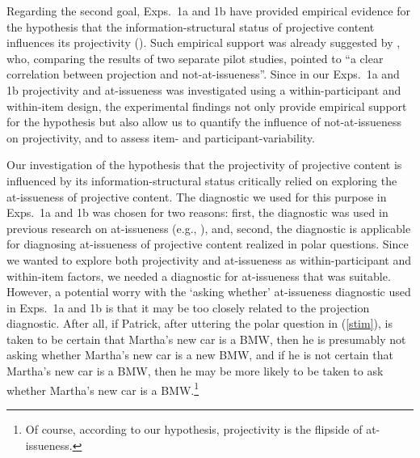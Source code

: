 \documentclass[11pt,fleqn]{article}
\newcommand{\6}{\mbox{$[\hspace*{-.6mm}[$}}
\newcommand{\9}{\mbox{$]\hspace*{-.6mm}]$}}
\begin{document}
Regarding the second goal, Exps.~1a and 1b have provided empirical evidence for the hypothesis that the information-structural status of projective content influences its projectivity (\citealt{brst-salt10,brst-ar}). Such empirical support was already suggested by \citet[180]{xue-onea11}, who, comparing the results of two separate pilot studies, pointed to ``a clear correlation between projection and not-at-issueness''. Since in our Exps.~1a and 1b projectivity and at-issueness was investigated using a within-participant and within-item design, the experimental findings not only provide empirical support for the hypothesis but also allow us to quantify the influence of not-at-issueness on projectivity, and to assess item- and participant-variability.

Our investigation of the hypothesis that the projectivity of projective content is influenced by its information-structural status critically relied on exploring the at-issueness of projective content. The diagnostic we used for this purpose in Exps.~1a and 1b was chosen for two reasons: first, the diagnostic was used in previous research on at-issueness (e.g., \citealt{amaral-etal07,tonhauser-sula6}), and, second, the diagnostic is applicable for diagnosing at-issueness of projective content realized in polar questions. Since we wanted to explore both projectivity and at-issueness as within-participant and within-item factors, we needed a diagnostic for at-issueness that was suitable. However, a potential worry with the `asking whether' at-issueness diagnostic used in Exps.~1a and 1b is that it may be too closely related to the projection diagnostic. After all, if Patrick, after uttering the polar question in (\ref{stim}), is taken to be certain that Martha's new car is a BMW, then he is presumably not asking whether Martha's new car is a new BMW, and if he is not certain that Martha's new car is a BMW, then he may be more likely to be taken to ask whether Martha's new car is a BMW.\footnote{Of course, according to our hypothesis, projectivity is the flipside of at-issueness.}
\end{document}
